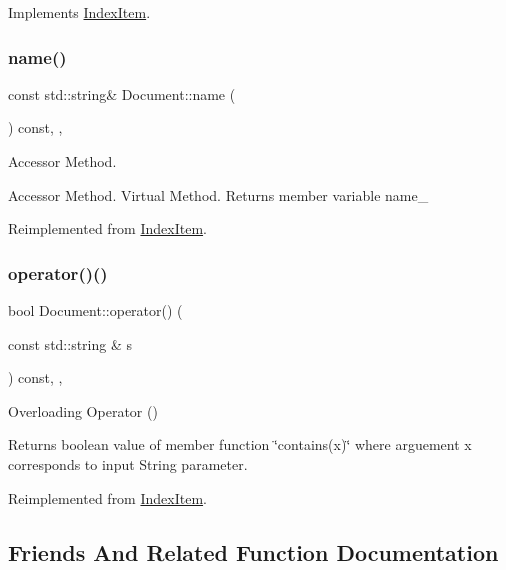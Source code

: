 Implements \hyperlink{class_index_item_a534d96bf041a485ed124663b9cded2fb}{Index\+Item}.

\mbox{\label{class_document_a68936706468433f1bbba813797e32bd5}} 
\subsubsection{\texorpdfstring{name()}{name()}}
{\footnotesize\ttfamily const std\+::string\& Document\+::name (\begin{DoxyParamCaption}{ }\end{DoxyParamCaption}) const\hspace{0.3cm}{\ttfamily [inline]}, {\ttfamily [override]}, {\ttfamily [virtual]}}



Accessor Method. 

Accessor Method. Virtual Method. Returns member variable name\+\_\+ 

Reimplemented from \hyperlink{class_index_item_a059cbae312c51ae7d02050f8f325bf93}{Index\+Item}.

\mbox{\label{class_document_a44b8141f08f57f9122b3dba4a59bf7e4}} 
\subsubsection{\texorpdfstring{operator()()}{operator()()}}
{\footnotesize\ttfamily bool Document\+::operator() (\begin{DoxyParamCaption}\item[{const std\+::string \&}]{s }\end{DoxyParamCaption}) const\hspace{0.3cm}{\ttfamily [inline]}, {\ttfamily [override]}, {\ttfamily [virtual]}}



Overloading Operator () 

Returns boolean value of member function \char`\"{}contains(x)\char`\"{} where arguement x corresponds to input String parameter. 

Reimplemented from \hyperlink{class_index_item_a38ccc46639b8d0b066024bad728c1bfa}{Index\+Item}.



\subsection{Friends And Related Function Documentation}
\mbox{\label{class_document_ab4b587c28bf3ed83ad2cb6e9052a5a58}} 
